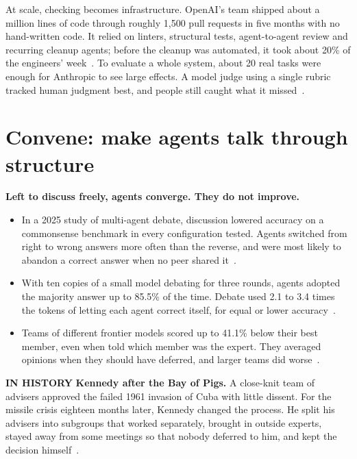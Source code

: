 \documentclass[11pt,letterpaper]{article}
\newcommand{\takeaway}[1]{\textbf{#1}}
\newcommand{\histlabel}[1]{{\sffamily\fontsize{7.6}{9.6}\selectfont\bfseries\color{muted}IN HISTORY}%
  \enspace\textbf{#1}\enspace}
\begin{document}
At scale, checking becomes infrastructure. OpenAI's team shipped about a million lines of code
through roughly 1,500 pull requests in five months with no hand-written code. It relied on
linters, structural tests, agent-to-agent review and recurring cleanup agents; before the
cleanup was automated, it took about 20\% of the engineers' week~\cite{openai}. To evaluate a
whole system, about 20 real tasks were enough for Anthropic to see large effects. A model
judge using a single rubric tracked human judgment best, and people still caught what it
missed~\cite{research}.

\section{Convene: make agents talk through structure}\label{sec:convene}

\takeaway{Left to discuss freely, agents converge. They do not improve.}

\begin{itemize}
  \item In a 2025 study of multi-agent debate, discussion lowered accuracy on a commonsense
        benchmark in every configuration tested. Agents switched from right to wrong answers
        more often than the reverse, and were most likely to abandon a correct answer when no
        peer shared it~\cite{wynn}.
  \item With ten copies of a small model debating for three rounds, agents adopted the
        majority answer up to 85.5\% of the time. Debate used 2.1 to 3.4 times the tokens of
        letting each agent correct itself, for equal or lower accuracy~\cite{cais}.
  \item Teams of different frontier models scored up to 41.1\% below their best member, even
        when told which member was the expert. They averaged opinions when they should have
        deferred, and larger teams did worse~\cite{pappu}.
\end{itemize}

\begin{history}
\histlabel{Kennedy after the Bay of Pigs.} A close-knit team of advisers approved the failed
1961 invasion of Cuba with little dissent. For the missile crisis eighteen months later,
Kennedy changed the process. He split his advisers into subgroups that worked separately,
brought in outside experts, stayed away from some meetings so that nobody deferred to him,
and kept the decision himself~\cite{janis}.
\end{history}
\end{document}
